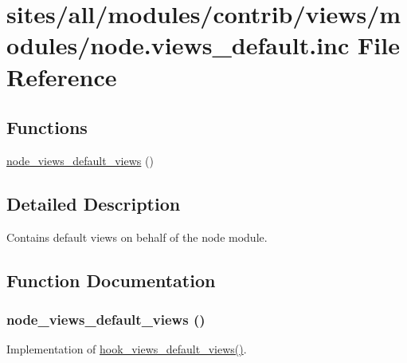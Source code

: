 \hypertarget{node_8views__default_8inc}{
\section{sites/all/modules/contrib/views/modules/node.views\_\-default.inc File Reference}
\label{node_8views__default_8inc}
}
\subsection*{Functions}
\begin{CompactItemize}
\item 
\hyperlink{node_8views__default_8inc_6ed0122e0fb76b63b17d2a5a704e952b}{node\_\-views\_\-default\_\-views} ()
\end{CompactItemize}


\subsection{Detailed Description}
Contains default views on behalf of the node module. 

\subsection{Function Documentation}
\hypertarget{node_8views__default_8inc_6ed0122e0fb76b63b17d2a5a704e952b}{
\subsubsection[{node\_\-views\_\-default\_\-views}]{\setlength{\rightskip}{0pt plus 5cm}node\_\-views\_\-default\_\-views ()}}
\label{node_8views__default_8inc_6ed0122e0fb76b63b17d2a5a704e952b}


Implementation of \hyperlink{group__views__hooks_g23edb74860682fa88f75cf94b97c2e15}{hook\_\-views\_\-default\_\-views()}. 